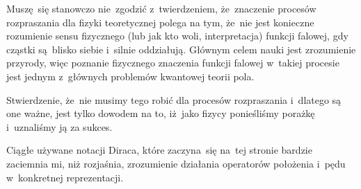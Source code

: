 \documentclass[a4paper,11pt]{article}
\begin{document}
\noindent
{} Muszę~się stanowczo nie~zgodzić z~twierdzeniem, że~znaczenie
procesów rozpraszania dla fizyki teoretycznej polega na tym, że~nie jest
konieczne rozumienie sensu fizycznego (lub jak kto woli, interpretacja)
funkcji falowej, gdy cząstki są~blisko siebie i~silnie oddziałują. Głównym
celem nauki jest zrozumienie przyrody, więc poznanie fizycznego znaczenia
funkcji falowej w~takiej procesie jest jednym z~głównych problemów
kwantowej teorii pola.

Stwierdzenie, że~nie musimy tego robić dla procesów rozpraszania
i~dlatego są one ważne, jest tylko dowodem na to, iż~jako fizycy
ponieśliśmy porażkę i~uznaliśmy ją za sukces.

\vspace{\spaceFour}





\noindent
{}

\vspace{\spaceFour}





\noindent
{} Ciągłe używane notacji Diraca, które zaczyna~się na~tej stronie
bardzie zaciemnia mi, niż rozjaśnia, zrozumienie działania operatorów
położenia i~pędu w~konkretnej reprezentacji.

\vspace{\spaceFour}





\noindent
{}

\vspace{\spaceFour}





\newpage

\end{document}
